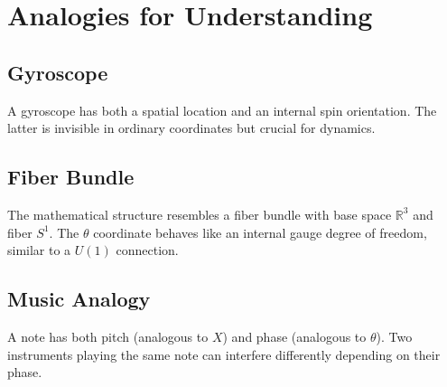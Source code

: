 \section{Analogies for Understanding}

\subsection{Gyroscope}
A gyroscope has both a spatial location and an internal spin orientation. The
latter is invisible in ordinary coordinates but crucial for dynamics.

\subsection{Fiber Bundle}
The mathematical structure resembles a fiber bundle with base space
$\mathbb{R}^3$ and fiber $S^1$. The $\theta$ coordinate behaves like an
internal gauge degree of freedom, similar to a $U(1)$ connection.

\subsection{Music Analogy}
A note has both pitch (analogous to $X$) and phase (analogous to $\theta$).
Two instruments playing the same note can interfere differently depending on
their phase.
